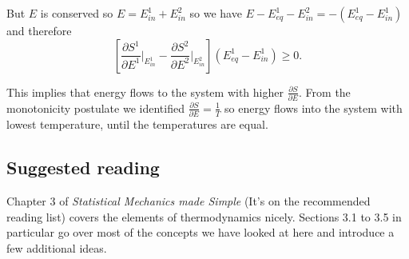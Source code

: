 But $E$ is conserved so $E=E^1_{in}+E^2_{in}$ so we have $E-E^1_{eq}-E^2_{in} = -(E^1_{eq}-E^1_{in})$ and therefore
$$\left[\frac{\partial S^1}{\partial E^1}\bigg\vert_{E^1_{in}} - \frac{\partial S^2}{\partial E^2}\bigg\vert_{E^2_{in}}\right]\left(E^1_{eq}-E^1_{in}\right)\geq 0.$$

This implies that energy flows to the  system with higher $\frac{\partial S}{\partial E}$. From the monotonicity postulate we identified  $\frac{\partial S}{\partial E}= \frac{1}{T}$ so energy flows into the system with lowest temperature, until the temperatures are equal.

\subsection{Suggested reading}
Chapter 3 of \emph{Statistical Mechanics made Simple} (It's on the recommended reading list) covers the elements of thermodynamics nicely. Sections 3.1 to 3.5 in particular go over most of the concepts we have looked at here and introduce a few additional ideas.
